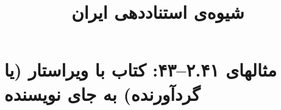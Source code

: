 \documentclass[a4paper,10pt]{article}
\begin{document}
\title{شیوه‌ی استناددهی ایران
 }
\author{}
\date{}
\maketitle



\section*{مثالهای ۲.۴۱--۴۳: کتاب با ویراستار (یا گردآورنده) به جای نویسنده}

\cite{نیازی1384}\\
\cite{موسوی1385}\\
\cite{طوسی1375}\\
\cite{افراسیابی1378}\\
\cite{kamrany1980}\\
\cite{mench1999}\\
\cite{eliot1953}\\






\end{document}
